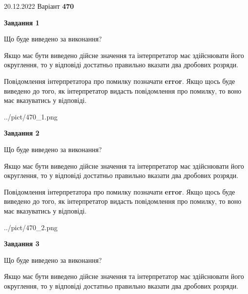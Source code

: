 \documentclass[12pt, ukrainian]{article}
\begin{document}
{20.12.2022 Варіант \No \textbf { 470 }\par}
{
\begin {Large}

{\begin {center}\textbf{Завдання 1}\end {center}}\par
Що буде виведено за виконання? \par

Якщо має бути виведено дійсне значення та інтерпретатор має здійснювати його округлення, 
то у відповіді достатньо правильно вказати два дробових розряди.

Повідомлення інтерпретатора про помилку позначати \textbf{error}.
Якщо щось буде виведено до того, як інтерпретатор видасть повідомлення про помилку, 
то воно має вказуватись у відповіді. \par

\begin{center}
	{../pict/470_1.png}
\end{center}
\newpage

{\begin {center}\textbf{Завдання 2}\end {center}}\par
Що буде виведено за виконання? \par

Якщо має бути виведено дійсне значення та інтерпретатор має здійснювати його округлення, 
то у відповіді достатньо правильно вказати два дробових розряди.

Повідомлення інтерпретатора про помилку позначати \textbf{error}.
Якщо щось буде виведено до того, як інтерпретатор видасть повідомлення про помилку, 
то воно має вказуватись у відповіді. \par

\begin{center}
	{../pict/470_2.png}
\end{center}
\newpage

{\begin {center}\textbf{Завдання 3}\end {center}}\par
Що буде виведено за виконання? \par

Якщо має бути виведено дійсне значення та інтерпретатор має здійснювати його округлення, 
то у відповіді достатньо правильно вказати два дробових розряди.


\end{Large}}
\end{document}
